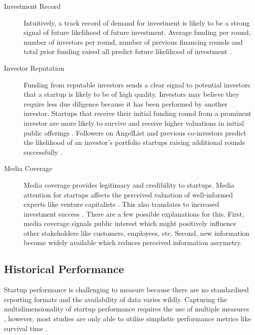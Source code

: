 \begin{description}

\item[Investment Record]

Intuitively, a track record of demand for investment is likely to be a strong signal of future likelihood of future investment. Average funding per round, number of investors per round, number of previous financing rounds and total prior funding raised all predict future likelihood of investment \cite{ahlers2015,beckwith2016,croce2016,hoenen2014,conti2013}.

\item[Investor Reputation]

Funding from reputable investors sends a clear signal to potential investors that a startup is likely to be of high quality. Investors may believe they require less due diligence because it has been performed by another investor. Startups that receive their initial funding round from a prominent investor are more likely to survive and receive higher valuations in initial public offerings \cite{hochberg2007}. Followers on AngelList and previous co-investors predict the likelihood of an investor's portfolio startups raising additional rounds successfully \cite{an2015,werth2013}.

\item[Media Coverage]

Media coverage provides legitimacy and credibility to startups. Media attention for startups affects the perceived valuation of well-informed experts like venture capitalists \cite{petkova2013}. This also translates to increased investment success \cite{beckwith2016}. There are a few possible explanations for this. First, media coverage signals public interest which might positively influence other stakeholders like customers, employees, etc. Second, new information become widely available which reduces perceived information assymetry.

\end{description}

\subsection{Historical Performance}

Startup performance is challenging to measure because there are no standardised reporting formats and the availability of data varies wildly. Capturing the multidimensionality of startup performance requires the use of multiple measures \cite{wiklund2005}, however, most studies are only able to utilise simplistic performance metrics like survival time \cite{raz2007, song2012, gloor2013}.

